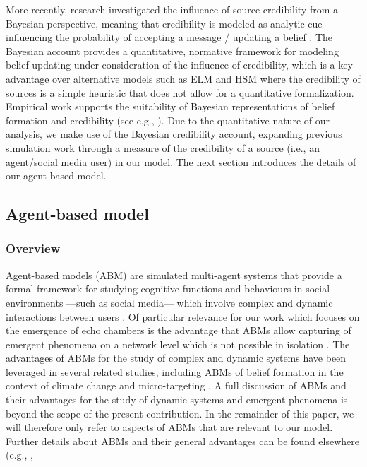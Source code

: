 \documentclass[doc,floatsintext]{apa6}
\begin{document}
More recently, research investigated the influence of source credibility from a Bayesian perspective, meaning that credibility is modeled as analytic cue influencing the probability of accepting a message / updating a belief \citep{bovens2003bayesian, hahn2009argument, harris2009bayesian, oaksford2007bayesian}. The Bayesian account provides a quantitative, normative framework for modeling belief updating under consideration of the influence of credibility, which is a key advantage over alternative models such as ELM and HSM where the credibility of sources is a simple heuristic that does not allow for a quantitative formalization. Empirical work supports the suitability of Bayesian representations of belief formation and credibility (see e.g., \cite{harris2016appeal}). Due to the quantitative nature of our analysis, we make use of the Bayesian credibility account, expanding previous simulation work \citep{madsen2017growing, madsen2018large} through a measure of the credibility of a source (i.e., an agent/social media user) in our model. The next section introduces the details of our agent-based model.



\subsection{Agent-based model}

\subsubsection{Overview}
Agent-based models (ABM) are simulated multi-agent systems that provide a formal framework for studying cognitive functions and behaviours in social environments ---such as social media--- which involve complex and dynamic interactions between users \citep{wilensky2015introduction}. Of particular relevance for our work which focuses on the emergence of echo chambers is the advantage that ABMs allow capturing of emergent phenomena on a network level which is not possible in isolation \citep{madsen2019analytic}. The advantages of ABMs for the study of complex and dynamic systems have been leveraged in several related studies, including ABMs of belief formation in the context of climate change \citep{lewandowsky2019influence} and micro-targeting \citep{madsen2018method}. A full discussion of ABMs and their advantages for the study of dynamic systems and emergent phenomena is beyond the scope of the present contribution. In the remainder of this paper, we will therefore only refer to aspects of ABMs that are relevant to our model. Further details about ABMs and their general advantages can be found elsewhere (e.g., \cite{wilensky1999netlogo, wilensky2015introduction, macal2005tutorial, madsen2019analytic}, 
\end{document}
